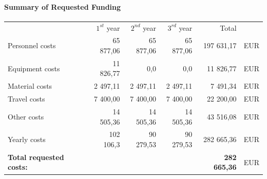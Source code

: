 \documentclass[11pt,a4paper,titlepage,oneside,onecolumn]{article}
\begin{document}
\paragraph{Summary of Requested Funding}
\begin{center}
\begin{tabular}{lrrrrl}
                        & $1^{st}$ year  &  $2^{nd}$ year & $3^{rd}$ year & Total & \\
Personnel costs   &  65 877,06 & 65 877,06 & 65 877,06  & 197 631,17 & EUR \\
Equipment costs   &  11 826,77 &  0,0 &  0,0 &  11 826,77 & EUR \\
Material costs    &  2 497,11  &  2 497,11  &  2 497,11  &  7 491,34 & EUR \\
Travel costs      &  7 400,00  & 7 400,00   & 7 400,00  &  22 200,00 & EUR \\
Other costs       &  14	505,36  & 14 505,36  & 14	505,36  &  43 516,08 & EUR \\
Yearly costs      & 102 106,3 & 90 279,53 & 90 279,53  & 282 665,36 & EUR \\
\hline
\textbf{Total requested costs:}    &   & & & \textbf{282 665,36} & EUR \\
\end{tabular}
\end{center}

\newpage
{}
\linespread{1.0}
\begin{small}


\end{small}
\end{document}
